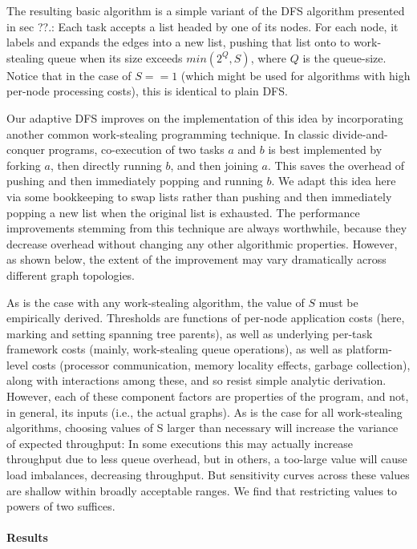 The resulting basic algorithm is a simple variant of the DFS algorithm
presented in sec ??.: Each task accepts a list headed by one of its
nodes.  For each node, it labels and expands the edges into a new
list, pushing that list onto to work-stealing queue when its size
exceeds $min(2^{Q}, S)$, where $Q$ is the queue-size. Notice that in
the case of $S==1$ (which might be used for algorithms with high
per-node processing costs), this is identical to plain DFS.

Our adaptive DFS improves on the implementation of this idea by
incorporating another common work-stealing programming technique. In
classic divide-and-conquer programs, co-execution of two tasks $a$ and $b$
is best implemented by forking $a$, then directly running $b$, and then
joining $a$.  This saves the overhead of pushing and then immediately
popping and running $b$.  We adapt this idea here via some bookkeeping
to swap lists rather than pushing and then immediately popping a new
list when the original list is exhausted. The performance improvements
stemming from this technique are always worthwhile, because they
decrease overhead without changing any other algorithmic
properties. However, as shown below, the extent of the improvement may
vary dramatically across different graph topologies.

As is the case with any work-stealing algorithm, the value of $S$ must
be empirically derived. Thresholds are functions of per-node
application costs (here, marking and setting spanning tree parents),
as well as underlying per-task framework costs (mainly, work-stealing
queue operations), as well as platform-level costs (processor
communication, memory locality effects, garbage collection), along
with interactions among these, and so resist simple analytic
derivation.  However, each of these component factors are properties
of the program, and not, in general, its inputs (i.e., the actual
graphs).  As is the case for all work-stealing algorithms, choosing
values of S larger than necessary will increase the variance of
expected throughput: In some executions this may actually increase
throughput due to less queue overhead, but in others, a too-large
value will cause load imbalances, decreasing throughput.  But
sensitivity curves across these values are shallow within broadly
acceptable ranges. We find that restricting values to powers of two
suffices.

\paragraph{Results}

